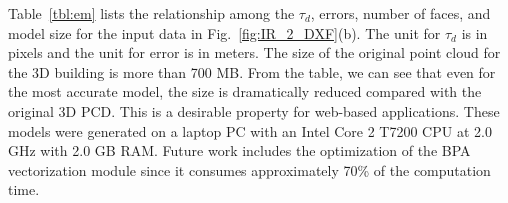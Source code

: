 \documentclass[10pt, conference, compsocconf]{IEEEtran}
\newcommand{\Eq}[1] {Eq.~(\ref{eq:#1})}
\newcommand{\Fig}[1]{Fig.~\ref{fig:#1}}
\newcommand{\Tbl}[1]{Table~\ref{tbl:#1}}
\newcommand{\Figb}[1]{Fig.~\ref{fig:#1}(b)}
\begin{document}
%
%
\Tbl{em} lists the relationship among the $\tau_d$, errors,
number of faces, and model size for the input data in \Figb{IR_2_DXF}.
The unit for $\tau_d$ is in pixels and the unit for error is in meters.
The size of the original point cloud for the 3D building is more than 700 MB.
From the table, we can see that even for the most accurate model,
the size is dramatically reduced compared with the original 3D PCD.
This is a desirable property for web-based applications.
These models were generated on a laptop PC with an Intel Core 2 T7200 CPU 
at 2.0 GHz with 2.0 GB RAM.
Future work includes the optimization of the BPA vectorization module since
it consumes approximately 70\% of the computation time.
\end{document}
